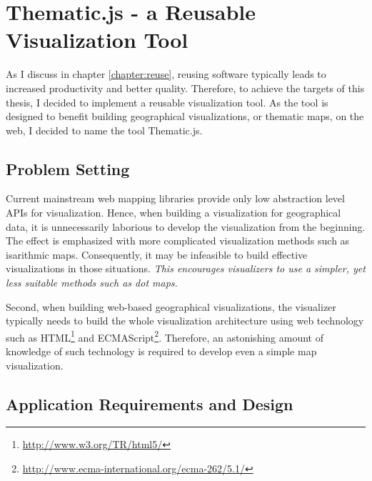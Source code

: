 
\chapter{Thematic.js - a Reusable Visualization Tool}
\label{chapter:implementation}




As I discuss in chapter \ref{chapter:reuse}, reusing software typically leads to increased productivity and better quality. Therefore, to achieve the targets of this thesis, I decided to implement a reusable visualization tool. As the tool is designed to benefit building geographical visualizations, or thematic maps, on the web, I decided to name the tool Thematic.js.

\section{Problem Setting}

Current mainstream web mapping libraries provide only low abstraction level APIs for visualization. Hence, when building a visualization for geographical data, it is unnecessarily laborious to develop the visualization from the beginning. The effect is emphasized with more complicated visualization methods such as isarithmic maps. Consequently, it may be infeasible to build effective visualizations in those situations. \emph{This encourages visualizers to use a simpler, yet less suitable methods such as dot maps.}

Second, when building web-based geographical visualizations, the visualizer typically needs to build the whole visualization architecture using web technology such as HTML\footnote{\url{http://www.w3.org/TR/html5/}} and ECMAScript\footnote{\url{http://www.ecma-international.org/ecma-262/5.1/}}. Therefore, an astonishing amount of knowledge of such technology is required to develop even a simple map visualization.

\section{Application Requirements and Design}
\label{section:requirements}

